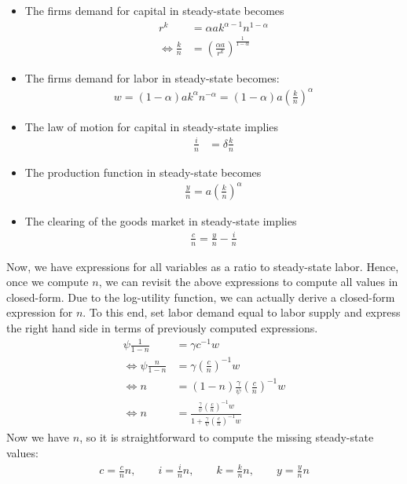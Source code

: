 \begin{enumerate}
\begin{itemize}

\item
The firms demand for capital in steady-state becomes
\begin{align*}
r^{k} &= \alpha a k^{\alpha-1} n^{1-\alpha}
\\
\Leftrightarrow \frac{k}{n} &= {\left(\frac{\alpha a}{r^{k}}\right)}^{\frac{1}{1-\alpha}}
\end{align*}

\item
The firms demand for labor in steady-state becomes:
\begin{align*}
w = (1-\alpha) a k^\alpha n^{-\alpha} = (1-\alpha)a {\left(\frac{k}{n}\right)}^\alpha
\end{align*}

\item
The law of motion for capital in steady-state implies
\begin{align*}
\frac{i}{n} &= \delta\frac{k}{n}
\end{align*}

\item
The production function in steady-state becomes
\begin{align*}
\frac{y}{n} = a {\left(\frac{k}{n}\right)}^\alpha
\end{align*}

\item The clearing of the goods market in steady-state implies 
\begin{align*}
\frac{c}{n} = \frac{y}{n} - \frac{i}{n}
\end{align*}

\end{itemize}

Now, we have expressions for all variables as a ratio to steady-state labor.
Hence, once we compute \(n\), we can revisit the above expressions to compute all values in closed-form.
Due to the log-utility function, we can actually derive a closed-form expression for \(n\).
To this end, set labor demand equal to labor supply and express the right hand side in terms of previously computed expressions.
\begin{align*}
\psi \frac{1}{1-n} &= \gamma c^{-1} w
\\
\Leftrightarrow \psi \frac{n}{1-n} &= \gamma {\left(\frac{c}{n}\right)}^{-1} w
\\
\Leftrightarrow n &= (1-n)\frac{\gamma}{\psi} {\left(\frac{c}{n}\right)}^{-1} w
\\
\Leftrightarrow n &= \frac{\frac{\gamma}{\psi} {\left(\frac{c}{n}\right)}^{-1} w}{1+\frac{\gamma}{\psi} {\left(\frac{c}{n}\right)}^{-1} w}
\end{align*}
Now we have \(n\), so it is straightforward to compute the missing steady-state values:
\begin{align*}
c = \frac{c}{n} n,\qquad
i = \frac{i}{n} n,\qquad
k = \frac{k}{n} n,\qquad	
y = \frac{y}{n} n
\end{align*}


\end{enumerate}
